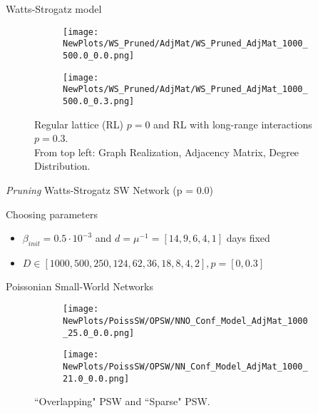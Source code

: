 \documentclass[xcolor={dvipsnames}]{beamer}
\begin{document}
\begin{frame}{Watts-Strogatz model}
	\begin{figure}
		\begin{subfigure}{.48\linewidth}
			\texttt{[image: NewPlots/WS\_Pruned/AdjMat/WS\_Pruned\_AdjMat\_1000\_500.0\_0.0.png]}
		\end{subfigure}
		\hspace{1mm}
		\begin{subfigure}{.45\linewidth}
			\texttt{[image: NewPlots/WS\_Pruned/AdjMat/WS\_Pruned\_AdjMat\_1000\_500.0\_0.3.png]} %
		\end{subfigure}%
	\caption{Regular lattice (RL) $ p=0$ and RL with long-range interactions $ p = 0.3$.\\
	From top left: Graph Realization, Adjacency Matrix, Degree Distribution. }
	\end{figure}
\end{frame}

\begin{frame}{\textit{Pruning} Watts-Strogatz SW Network (p = 0.0)}
	\vspace{-2mm}
	\begin{block}{Choosing parameters}
		\begin{itemize}
		\item $\beta_{init} = 0.5 \cdot 10^{-3}$ and $d = \mu^{-1} = [14,9,6,4,1]$ days fixed
		\item $D \in [1000,500,250,124,62,36,18,8,4,2], p = [0,0.3]$
		\end{itemize} 
	\end{block}
	\begin{figure}[h]
		\centering
	\end{figure}
\end{frame}

\begin{frame}{Poissonian Small-World Networks}
	\begin{figure}
		\begin{subfigure}{.48\linewidth}
			\texttt{[image: NewPlots/PoissSW/OPSW/NNO\_Conf\_Model\_AdjMat\_1000\_25.0\_0.0.png]}
		\end{subfigure}
		\hspace{1mm}
		\begin{subfigure}{.45\linewidth}
			\texttt{[image: NewPlots/PoissSW/OPSW/NN\_Conf\_Model\_AdjMat\_1000\_21.0\_0.0.png]} %
		\end{subfigure}%
	\caption{``Overlapping" PSW and ``Sparse" PSW.}
	\end{figure}
\end{frame}
\end{document}
